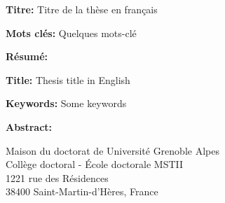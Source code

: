 \documentclass[french,12pt,a4paper]{book}
\begin{document}
\small

\begin{mdframed}[linecolor=orange,linewidth=1]

\textbf{Titre:} Titre de la thèse en français


\noindent \textbf{Mots clés:} Quelques mots-clé

\vspace{-.5cm}
\begin{multicols}{2}
\noindent \textbf{Résumé:}\lipsum[1-2] 
\end{multicols}

\end{mdframed}

\begin{mdframed}[linecolor=orange,linewidth=1]

\textbf{Title:} Thesis title in English

\noindent \textbf{Keywords:} Some keywords

\begin{multicols}{2}
\noindent \textbf{Abstract:} \lipsum[1-2]
\end{multicols}
\end{mdframed}

\vspace{\fill} %

\noindent
\color{orange} \footnotesize Maison du doctorat de Université Grenoble Alpes\\
Collège doctoral - École doctorale MSTII\\
1221 rue des Résidences\\
38400 Saint-Martin-d’Hères, France




\end{document}
